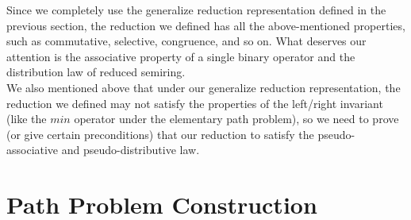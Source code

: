 \documentclass[a4paper,10pt]{article}
\begin{document}
Since we completely use the generalize reduction representation defined in the previous section, the reduction we defined has all the above-mentioned properties, such as commutative, selective, congruence, and so on. What deserves our attention is the associative property of a single binary operator and the distribution law of reduced semiring.\\
We also mentioned above that under our generalize reduction representation, the reduction we defined may not satisfy the properties of the left/right invariant (like the $min$ operator under the elementary path problem), so we need to prove (or give certain preconditions) that our reduction to satisfy the pseudo-associative and pseudo-distributive law.\\
\section{Path Problem Construction}
\medskip

 

\end{document}
